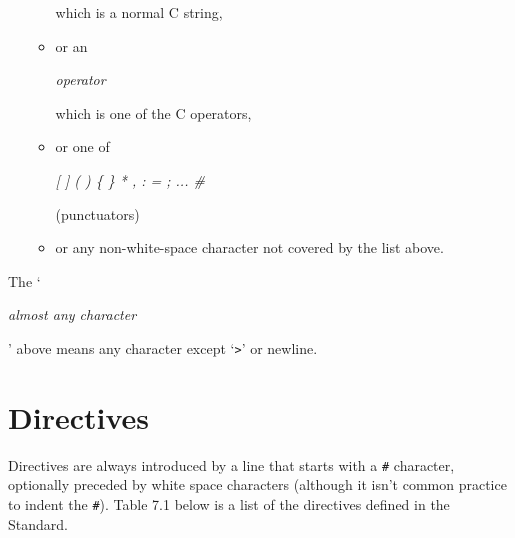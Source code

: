 \begin{enumerate}
\begin{itemize}
 which is a normal C string,
     \item or an \begin{center}\textit{operator}\end{center}

 which is one of the C operators,
     \item or one of \begin{center}\textit{[ ] ( ) \{ \} * , : = ; ... \#}\end{center}

 (punctuators)
     \item or any non-white-space character not covered by the list above.
    \end{itemize}
   
  \end{enumerate}

  The `\begin{center}\textit{almost any character}\end{center}

' above means any character
   except `\texttt{>}' or newline.


 
        \section{Directives}
        

  

  Directives are always introduced by a line that starts with
   a \texttt{\#} character, optionally preceded by white space characters
   (although it isn't common practice to indent the \texttt{\#}).
   Table 7.1 below is a list of the directives defined in the
   Standard.


